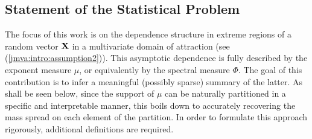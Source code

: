 \subsection{Statement of the Statistical Problem}\label{jmva:sec:decomposMu}

The focus of this work  is on 
the dependence structure in extreme regions of a %
random vector $\mathbf X$ in a multivariate domain of attraction (see
(\ref{jmva:intro:assumption2})). This asymptotic dependence   %
 is fully described by the exponent measure $\mu$, or
equivalently by the spectral measure $\Phi$. The goal 
 of this contribution is to  infer a  meaningful  (possibly sparse) summary of the latter.   %
 As shall be seen below,
since the support of $\mu$ can be naturally partitioned in a specific
and interpretable manner, this boils down to accurately recovering the
mass spread on each element of the partition.  In order to formulate
this approach rigorously, additional %
definitions are required.
\medskip

